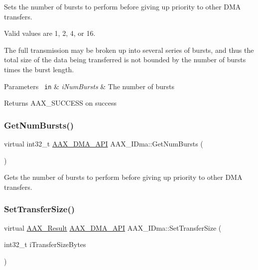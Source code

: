 Sets the number of bursts to perform before giving up priority to other D\+MA transfers. 

Valid values are 1, 2, 4, or 16.

The full transmission may be broken up into several series of bursts, and thus the total size of the data being transferred is not bounded by the number of bursts times the burst length.


\begin{DoxyParams}[1]{Parameters}
\mbox{\texttt{ in}}  & {\em i\+Num\+Bursts} & The number of bursts\\
\hline
\end{DoxyParams}
\begin{DoxyReturn}{Returns}
{\ttfamily A\+A\+X\+\_\+\+S\+U\+C\+C\+E\+SS} on success 
\end{DoxyReturn}
\mbox{\label{a01809_ae8a335f5230a5f7face87f9efb7c8aaf}} 
\subsubsection{\texorpdfstring{GetNumBursts()}{GetNumBursts()}}
{\footnotesize\ttfamily virtual int32\+\_\+t \mbox{\hyperlink{a00587_acae60d01e5e4bd3282369d0d9d378f3f}{A\+A\+X\+\_\+\+D\+M\+A\+\_\+\+A\+PI}} A\+A\+X\+\_\+\+I\+Dma\+::\+Get\+Num\+Bursts (\begin{DoxyParamCaption}{ }\end{DoxyParamCaption})\hspace{0.3cm}{\ttfamily [pure virtual]}}



Gets the number of bursts to perform before giving up priority to other D\+MA transfers. 

\mbox{\label{a01809_a4d38f5502dc2446ea997e675d3f59d61}} 
\subsubsection{\texorpdfstring{SetTransferSize()}{SetTransferSize()}}
{\footnotesize\ttfamily virtual \mbox{\hyperlink{a00392_a4d8f69a697df7f70c3a8e9b8ee130d2f}{A\+A\+X\+\_\+\+Result}} \mbox{\hyperlink{a00587_acae60d01e5e4bd3282369d0d9d378f3f}{A\+A\+X\+\_\+\+D\+M\+A\+\_\+\+A\+PI}} A\+A\+X\+\_\+\+I\+Dma\+::\+Set\+Transfer\+Size (\begin{DoxyParamCaption}\item[{int32\+\_\+t}]{i\+Transfer\+Size\+Bytes }\end{DoxyParamCaption})\hspace{0.3cm}{\ttfamily [pure virtual]}}



